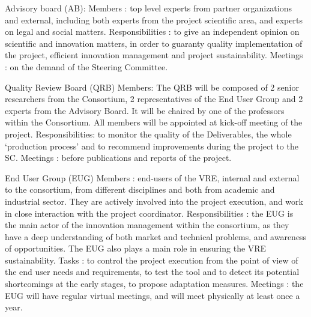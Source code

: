 Advisory board (AB):
Members : top level experts from partner organizations and external, including both experts from the project scientific
area, and experts on legal and social matters.
Responsibilities : to give an independent opinion on scientific and innovation matters, in order to guaranty quality 
implementation of the project, efficient innovation management and project sustainability.
Meetings : on the demand of the Steering Committee.

Quality Review Board (QRB)
Members: The QRB will be composed of 2 senior researchers from the Consortium, 2 representatives of the End User Group
and 2 experts from the Advisory Board. It will be chaired by one of the professors within the Consortium. All members
will be appointed at kick-off meeting of the project. 
Responsibilities: to monitor the quality of the Deliverables, the whole ‘production process’ and to recommend 
improvements during the project to the SC. 
Meetings : before publications and reports of the project.

End User Group (EUG)
Members : end-users of the VRE, internal and external to the consortium, from different disciplines and both from 
academic and industrial sector. They are actively involved into the project execution, and work in close interaction 
with the project coordinator. 
Responsibilities : the EUG is the main actor of the innovation management within the consortium, as they have a deep
understanding of both market and technical problems, and awareness of  opportunities. The EUG also plays a main role 
in ensuring the VRE sustainability. 
Tasks : to control the project execution from the point of view of the end user needs and requirements, 
to test the tool and to detect its potential shortcomings at the early stages, to propose adaptation measures. 
Meetings : the EUG will have regular virtual meetings, and will meet physically at least once a year.


